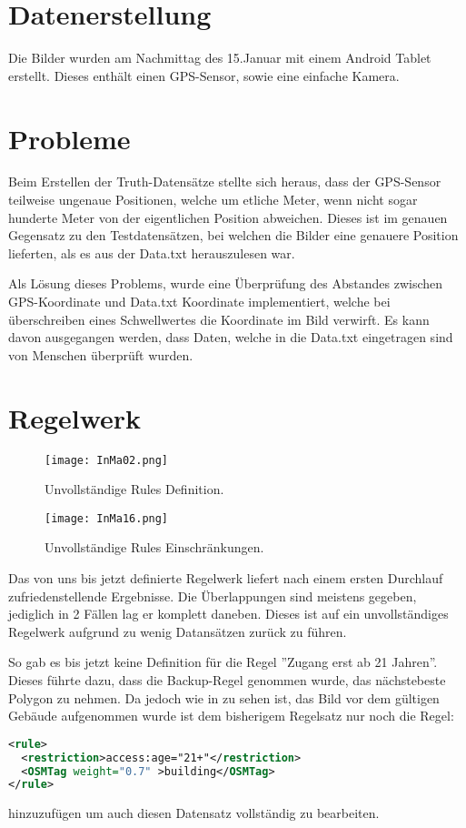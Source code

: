 \section{Datenerstellung}
Die Bilder wurden am Nachmittag des 15.Januar mit einem Android Tablet erstellt.
Dieses enthält einen GPS-Sensor, sowie eine einfache Kamera.

\section{Probleme}
Beim Erstellen der Truth-Datensätze stellte sich heraus, dass der GPS-Sensor teilweise
ungenaue Positionen, welche um etliche Meter, wenn nicht sogar hunderte Meter von
der eigentlichen Position abweichen. Dieses ist im genauen Gegensatz zu den Testdatensätzen,
bei welchen die Bilder eine genauere Position lieferten, als es aus der Data.txt
herauszulesen war.

Als Lösung dieses Problems, wurde eine Überprüfung des Abstandes zwischen GPS-Koordinate
und Data.txt Koordinate implementiert, welche bei überschreiben eines Schwellwertes
die Koordinate im Bild verwirft. Es kann davon ausgegangen werden, dass Daten, welche
in die Data.txt eingetragen sind von Menschen überprüft wurden.


\section{Regelwerk}
\begin{figure}
  \texttt{[image: InMa02.png]}
  \caption{Unvollständige Rules Definition.}
  \label{fig:NoRule}
\end{figure}

\begin{figure}
  \texttt{[image: InMa16.png]}
  \caption{Unvollständige Rules Einschränkungen.}
  \label{fig:MissingCircle}
\end{figure}
Das von uns bis jetzt definierte Regelwerk liefert nach einem ersten Durchlauf
zufriedenstellende Ergebnisse. Die Überlappungen sind meistens gegeben, jediglich
in 2 Fällen lag er komplett daneben. Dieses ist auf ein unvollständiges Regelwerk
aufgrund zu wenig Datansätzen zurück zu führen.

So gab es bis jetzt keine Definition für die Regel ''Zugang erst ab 21 Jahren''.
Dieses führte dazu, dass die Backup-Regel genommen wurde, das nächstebeste Polygon zu nehmen.
Da jedoch wie in  zu sehen ist, das Bild vor dem gültigen Gebäude aufgenommen
wurde ist dem bisherigem Regelsatz nur noch die Regel:
\begin{lstlisting}[language=xml,frame=single]
<rule>
  <restriction>access:age="21+"</restriction>
  <OSMTag weight="0.7" >building</OSMTag>
</rule>
\end{lstlisting}
hinzuzufügen um auch diesen Datensatz vollständig zu bearbeiten.


